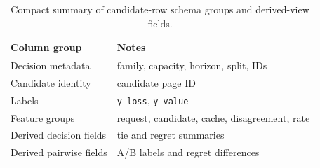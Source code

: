 \begin{table}[t]
  \caption{Compact summary of candidate-row schema groups and derived-view fields.}
  \label{tab:schema-summary}
  \centering
  \footnotesize
  \begin{tabularx}{\columnwidth}{@{}P{0.31\columnwidth}L@{}}
    \toprule
    Column group & Notes \\
    \midrule
    Decision metadata & family, capacity, horizon, split, IDs \\
    Candidate identity & candidate page ID \\
    Labels & \texttt{y\_loss}, \texttt{y\_value} \\
    Feature groups & request, candidate, cache, disagreement, rate \\
    Derived decision fields & tie and regret summaries \\
    Derived pairwise fields & A/B labels and regret differences \\
    \bottomrule
  \end{tabularx}
\end{table}
